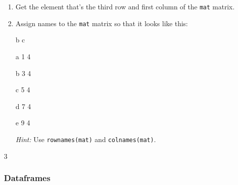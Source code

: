 \documentclass[answers]{exam}
\begin{document}
\begin{enumerate}
\item Get the element that's the third row and first column of the \texttt{mat} matrix.

\item Assign names to the \texttt{mat} matrix so that it looks like this:

\indent b c
   
  a 1 4

  b 3 4

  c 5 4

  d 7 4

  e 9 4

\textit{Hint:} Use \texttt{rownames(mat)} and \texttt{colnames(mat)}.

\end{enumerate}
\begin{solution}
\begin{Schunk}
\begin{Soutput}
[1] 3
\end{Soutput}
\end{Schunk}
\begin{Schunk}
\end{Schunk}
\end{solution}

\subsubsection{Dataframes}
\end{document}
